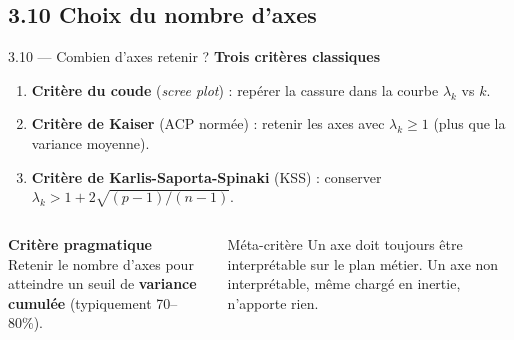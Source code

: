 \subsection{3.10 Choix du nombre d'axes}
\begin{frame}{3.10 — Combien d'axes retenir ?}
\textbf{Trois critères classiques}
\begin{enumerate}
  \item \textbf{Critère du coude} (\emph{scree plot}) : repérer la cassure dans la courbe
        $\lambda_k$ vs $k$.
  \item \textbf{Critère de Kaiser} (ACP normée) : retenir les axes avec $\lambda_k \geq 1$
        (plus que la variance moyenne).
  \item \textbf{Critère de Karlis-Saporta-Spinaki} (KSS) : conserver
        $\lambda_k > 1 + 2\sqrt{(p-1)/(n-1)}$.
\end{enumerate}

\begin{columns}[T]
\textbf{Critère pragmatique}\\
\small Retenir le nombre d'axes pour atteindre un seuil de
\textbf{variance cumulée} (typiquement 70--80\%).

\vspace{0.2cm}
\begin{alertblock}{Méta-critère}
\small Un axe doit toujours être \alert{interprétable} sur le plan métier.
Un axe non interprétable, même chargé en inertie, n'apporte rien.
\end{alertblock}
\end{columns}
\end{frame}

